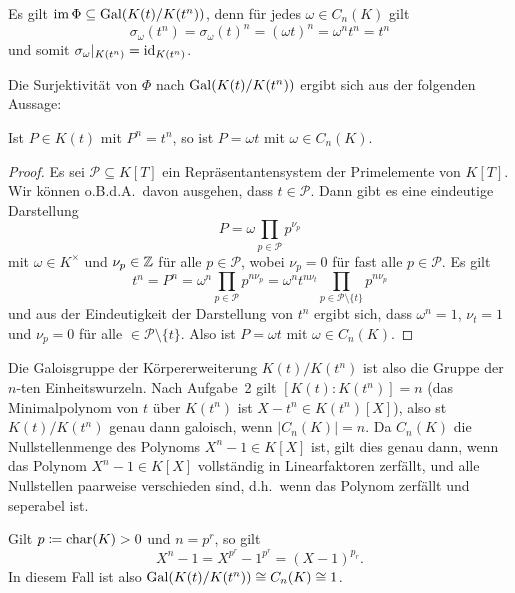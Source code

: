 \documentclass[a4paper,10pt,numbers=noenddot]{scrartcl}
\begin{document}
Es gilt $\operatorname{im} \Phi \subseteq \operatorname{Gal}(K(t) / K(t^n))$,
denn für jedes $\omega \in C_n(K)$ gilt
\[
    \sigma_\omega(t^n)
  = \sigma_\omega(t)^n
  = (\omega t)^n
  = \omega^n t^n
  = t^n
\]
und somit $\sigma_\omega|_{K(t^n)} = \operatorname{id}_{K(t^n)}$.

Die Surjektivität von $\Phi$ nach $\operatorname{Gal}(K(t) / K(t^n))$ ergibt sich aus der folgenden Aussage:

\begin{claim}
  Ist $P \in K(t)$ mit $P^n = t^n$, so ist $P = \omega t$ mit $\omega \in C_n(K)$.
\end{claim}
\begin{proof}
  Es sei $\mathcal{P} \subseteq K[T]$ ein Repräsentantensystem der Primelemente von $K[T]$.
  Wir können o.B.d.A.\ davon ausgehen, dass $t \in \mathcal{P}$.
  Dann gibt es eine eindeutige Darstellung
  \[
    P = \omega \prod_{p \in \mathcal{P}} p^{\nu_p}
  \]
  mit $\omega \in K^\times$ und $\nu_p \in \mathbb{Z}$ für alle $p \in \mathcal{P}$, wobei $\nu_p = 0$ für fast alle $p \in \mathcal{P}$.
  Es gilt
  \[
      t^n
    = P^n
    = \omega^n \prod_{p \in \mathcal{P}} p^{n \nu_p}
    = \omega^n t^{n \nu_t} \prod_{p \in \mathcal{P} \setminus \{t\}} p^{n \nu_p}
  \]
  und aus der Eindeutigkeit der Darstellung von $t^n$ ergibt sich, dass $\omega^n = 1$, $\nu_t = 1$ und $\nu_p = 0$ für alle $ \in \mathcal{P} \setminus \{t\}$.
  Also ist $P = \omega t$ mit $\omega \in C_n(K)$.
\end{proof}

Die Galoisgruppe der Körpererweiterung $K(t)/K(t^n)$ ist also die Gruppe der $n$-ten Einheitswurzeln.
Nach Aufgabe~2 gilt $[K(t) : K(t^n)] = n$ (das Minimalpolynom von $t$ über $K(t^n)$ ist $X - t^n \in K(t^n)[X]$),
also st $K(t)/K(t^n)$ genau dann galoisch, wenn $|C_n(K)| = n$.
Da $C_n(K)$ die Nullstellenmenge des Polynoms $X^n - 1 \in K[X]$ ist, gilt dies genau dann, wenn das Polynom $X^n - 1 \in K[X]$ vollständig in Linearfaktoren zerfällt, und alle Nullstellen paarweise verschieden sind, d.h.\ wenn das Polynom zerfällt und seperabel ist.

Gilt $p \coloneqq \operatorname{char}(K) > 0$ und $n = p^r$, so gilt
\[
    X^n - 1
  = X^{p^r} - 1^{p^r}
  = (X - 1)^{p_r}.
\]
In diesem Fall ist also $\operatorname{Gal}(K(t) / K(t^n)) \cong C_n(K) \cong 1$.
\end{document}
